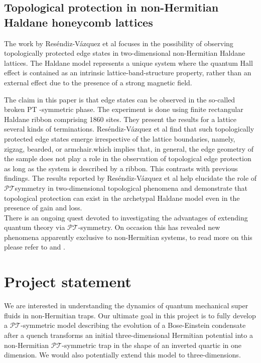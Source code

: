 \documentclass[12pt, a4paper]{report}
\newcommand\PT{\(\mathcal{PT}\)}
\begin{document}
\section{Topological protection in non-Hermitian Haldane honeycomb lattices}\label{TopoProtecc}
The work by Res\'endiz-V\'azquez et al focuses in the possibility of observing topologically protected
edge states in two-dimensional non-Hermitian Haldane lattices\cite{Tprotecc}.
The Haldane model represents a unique system where the quantum Hall effect is contained as an intrinsic lattice-band-structure property, rather than an external effect due to the presence of a strong magnetic
field\cite{QuantumAnomalousEffect}. 

The claim in this paper is that edge states can be observed in the so-called broken PT -symmetric phase. 
The experiment is done using finite rectangular Haldane ribbon comprising 1860 sites. They present
the results for a lattice several kinds of terminations. Res\'endiz-V\'azquez et al find that such topologically protected edge states emerge irrespective of the lattice boundaries, namely, zigzag, bearded, or armchair.which implies that, in general, the edge geometry of the sample does not play a role in the observation of topological edge protection as long as the system is described by a ribbon. This contrasts with previous findings. The results reported by Res\'endiz-V\'azquez et al help elucidate the role of
\PT symmetry in two-dimensional topological phenomena and demonstrate that topological protection can exist in the archetypal Haldane model even in the presence of gain and loss\cite{Tprotecc}.\\

There is an ongoing quest devoted to investigating the advantages of extending quantum theory via \PT-symmetry. On occasion this has revealed new phenomena apparently exclusive to non-Hermitian systems, to read more on this please refer to \cite{EigenspaceEPs} and \cite{NHQuantumHall}.

\chapter{Project statement}\label{MINE}
We are interested in understanding the dynamics of quantum mechanical super fluids in non-Hermitian traps. Our ultimate goal in this project is to fully develop a \PT-symmetric model describing the evolution of a Bose-Einstein condensate after a quench transforms an initial three-dimensional Hermitian potential into a non-Hermitian \PT-symmetric trap in the shape of an inverted quartic in one dimension. We would also potentially extend this model to three-dimensions. 
\end{document}
